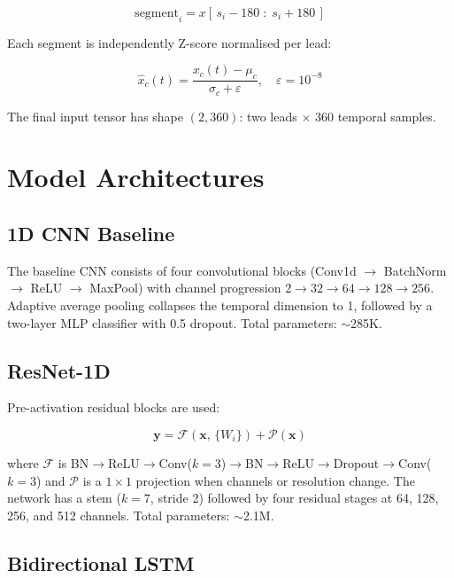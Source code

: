 \documentclass[conference]{IEEEtran}
\begin{document}
\begin{equation}
\text{segment}_i = x[\,s_i - 180\; :\; s_i + 180\,]
\end{equation}

Each segment is independently Z-score normalised per lead:

\begin{equation}
\hat{x}_{c}(t) = \frac{x_c(t) - \mu_c}{\sigma_c + \varepsilon}, \quad \varepsilon = 10^{-8}
\end{equation}

The final input tensor has shape $(2, 360)$: two leads $\times$ 360 temporal samples.

\section{Model Architectures}

\subsection{1D CNN Baseline}

The baseline CNN consists of four convolutional blocks (Conv1d $\to$ BatchNorm $\to$ ReLU $\to$ MaxPool) with channel progression $2\!\to\!32\!\to\!64\!\to\!128\!\to\!256$. Adaptive average pooling collapses the temporal dimension to 1, followed by a two-layer MLP classifier with 0.5 dropout. Total parameters: $\sim$285K.

\subsection{ResNet-1D}

Pre-activation residual blocks \cite{b16} are used:

\begin{equation}
\mathbf{y} = \mathcal{F}(\mathbf{x},\,\{W_i\}) + \mathcal{P}(\mathbf{x})
\end{equation}

where $\mathcal{F}$ is BN$\to$ReLU$\to$Conv($k{=}3$)$\to$BN$\to$ReLU$\to$Dropout$\to$Conv($k{=}3$) and $\mathcal{P}$ is a $1{\times}1$ projection when channels or resolution change. The network has a stem ($k{=}7$, stride 2) followed by four residual stages at 64, 128, 256, and 512 channels. Total parameters: $\sim$2.1M.

\subsection{Bidirectional LSTM}
\end{document}
